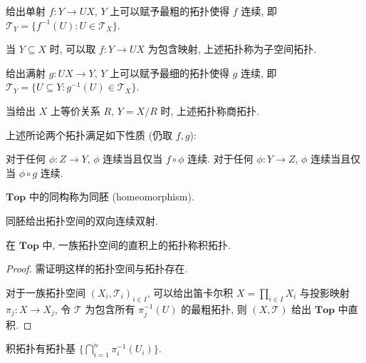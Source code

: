 \begin{definition}[子空间拓扑]
    给出单射 \(f : Y \to U X\), \(Y\) 上可以赋予最粗的拓扑使得 \(f\) 连续, 即 \(\mathcal{T}_Y = \{f^{-1} (U) : U \in \mathcal{T}_X\}\).

    当 \(Y \subseteq X\) 时, 可以取 \(f : Y \to U X\) 为包含映射, 上述拓扑称为子空间拓扑.
\end{definition}

\begin{definition}[商拓扑]
    给出满射 \(g : U X \to Y\), \(Y\) 上可以赋予最细的拓扑使得 \(g\) 连续, 即 \(\mathcal{T}_Y = \{U \subseteq Y : g^{-1} (U) \in \mathcal{T}_X\}\).

    当给出 \(X\) 上等价关系 \(R\), \(Y = X/R\) 时, 上述拓扑称商拓扑.
\end{definition}

\begin{lemma}
    上述所论两个拓扑满足如下性质 (仍取 \(f,g\)):

    对于任何 \(\phi : Z \to Y\), \(\phi\) 连续当且仅当 \(f \circ \phi\) 连续.
    对于任何 \(\phi : Y \to Z\), \(\phi\) 连续当且仅当 \(\phi \circ g\) 连续.
\end{lemma}

\begin{definition}[同胚]
    \(\mathbf{Top}\) 中的同构称为同胚 (homeomorphism).
\end{definition}

\begin{corollary}
    同胚给出拓扑空间的双向连续双射.
\end{corollary}

\begin{definition}[积拓扑]
    在 \(\mathbf{Top}\) 中, 一族拓扑空间的直积上的拓扑称积拓扑.

    \begin{proof}
        需证明这样的拓扑空间与拓扑存在.

        对于一族拓扑空间 \({(X_i, \mathcal{T}_i)}_{i \in I}\), 可以给出笛卡尔积 \(X = \prod_{i \in I} X_i\) 与投影映射
        \(\pi_j : X \to X_j\), 令 \(\mathcal{T}\) 为包含所有 \(\pi_j^{-1} (U)\) 的最粗拓扑, 则 \((X,\mathcal{T})\) 给出 \(\mathbf{Top}\) 中直积.
    \end{proof}
\end{definition}

\begin{corollary}
    积拓扑有拓扑基 \(\{\bigcap_{i = 1}^n \pi_i^{-1} (U_i)\}\).
\end{corollary}

